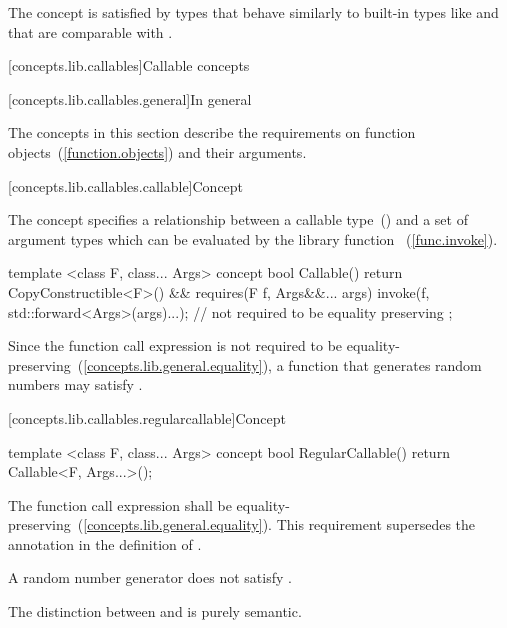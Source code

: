 \begin{itemdescr}
\pnum
\enternote The  concept is satisfied by types that behave
similarly to built-in types like  and that are comparable with \tcode{==}.\exitnote
\end{itemdescr}

[concepts.lib.callables]{Callable concepts}

[concepts.lib.callables.general]{In general}

\pnum
The concepts in this section describe the requirements on function
objects~(\ref{function.objects}) and their arguments.

[concepts.lib.callables.callable]{Concept }

\pnum
The  concept specifies a relationship between a callable
type~()  and a set of argument types  which
can be evaluated by the library function ~(\ref{func.invoke}).

%
\begin{itemdecl}
template <class F, class... Args>
concept bool Callable() {
  return CopyConstructible<F>() &&
    requires(F f, Args&&... args) {
      invoke(f, std::forward<Args>(args)...); // not required to be equality preserving
    };
}
\end{itemdecl}

\begin{itemdescr}
\pnum
\enternote Since the  function call
expression is not required to be
equality-preserving~(\ref{concepts.lib.general.equality}), a function that generates random numbers
may satisfy .\exitnote
\end{itemdescr}

[concepts.lib.callables.regularcallable]{Concept }

%
\begin{itemdecl}
template <class F, class... Args>
concept bool RegularCallable() {
  return Callable<F, Args...>();
}
\end{itemdecl}

\begin{itemdescr}
\pnum
The  function call expression shall be
equality-preserving~(\ref{concepts.lib.general.equality}). \enternote This requirement supersedes the
annotation in the definition of . \exitnote

\pnum
\enternote A random number generator does not satisfy
.\exitnote

\pnum
\enternote The distinction between  and
 is purely semantic.\exitnote
\end{itemdescr}

